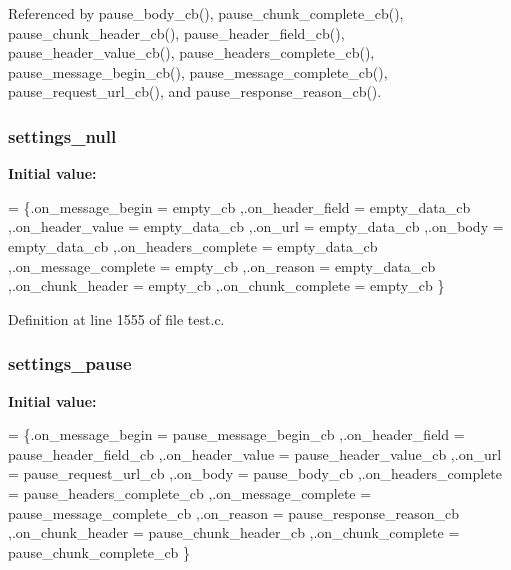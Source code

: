Referenced by pause\+\_\+body\+\_\+cb(), pause\+\_\+chunk\+\_\+complete\+\_\+cb(), pause\+\_\+chunk\+\_\+header\+\_\+cb(), pause\+\_\+header\+\_\+field\+\_\+cb(), pause\+\_\+header\+\_\+value\+\_\+cb(), pause\+\_\+headers\+\_\+complete\+\_\+cb(), pause\+\_\+message\+\_\+begin\+\_\+cb(), pause\+\_\+message\+\_\+complete\+\_\+cb(), pause\+\_\+request\+\_\+url\+\_\+cb(), and pause\+\_\+response\+\_\+reason\+\_\+cb().

\subsubsection[{settings\+\_\+null}]{ settings\+\_\+null\hspace{0.3cm}{\ttfamily [static]}}\label{test_8c_a3a28672631c46d31a2b3e28aa2284eac}
{\bfseries Initial value\+:}
\begin{DoxyCode}
=
  \{.on\_message\_begin = empty_cb
  ,.on\_header\_field = empty_data_cb
  ,.on\_header\_value = empty_data_cb
  ,.on\_url = empty_data_cb
  ,.on\_body = empty_data_cb
  ,.on\_headers\_complete = empty_data_cb
  ,.on\_message\_complete = empty_cb
  ,.on\_reason = empty_data_cb
  ,.on\_chunk\_header = empty_cb
  ,.on\_chunk\_complete = empty_cb
  \}
\end{DoxyCode}


Definition at line 1555 of file test.\+c.

\subsubsection[{settings\+\_\+pause}]{ settings\+\_\+pause\hspace{0.3cm}{\ttfamily [static]}}\label{test_8c_a19b54d73e1e599f0fd8507007d91bcb4}
{\bfseries Initial value\+:}
\begin{DoxyCode}
=
  \{.on\_message\_begin = pause_message_begin_cb
  ,.on\_header\_field = pause_header_field_cb
  ,.on\_header\_value = pause_header_value_cb
  ,.on\_url = pause_request_url_cb
  ,.on\_body = pause_body_cb
  ,.on\_headers\_complete = pause_headers_complete_cb
  ,.on\_message\_complete = pause_message_complete_cb
  ,.on\_reason = pause_response_reason_cb
  ,.on\_chunk\_header = pause_chunk_header_cb
  ,.on\_chunk\_complete = pause_chunk_complete_cb
  \}
\end{DoxyCode}


